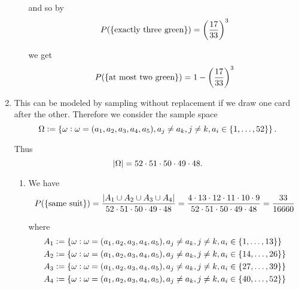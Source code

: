 \begin{enumerate}[label = \textbf{Exercise \arabic*.},wide = 0pt, itemsep=1.5ex]
\begin{enumerate}[label = \arabic*.,wide = 0pt, itemsep=1.5ex]
			\noindent and so by 
			\begin{equation*}
				P(\cbr[0]{\text{exactly three green}}) = \del[3]{\frac{17}{33}}^3
			\end{equation*}

			\noindent we get 
			\begin{equation*}
				P(\cbr[0]{\text{at most two green}}) = 1 - \del[3]{\frac{17}{33}}^3
			\end{equation*}
	\end{enumerate}
\item
	This can be modeled by sampling without replacement if we draw one card after the other. Therefore we consider the sample space
		\begin{equation*}
				\Omega := \cbr[0]{\omega : \omega = (a_1,a_2,a_3,a_4,a_5), a_j \neq a_k, j\neq k, a_i \in \cbr[0]{1,\dots,52}}.
		\end{equation*}

		Thus
		\begin{equation}
			\abs[0]{\Omega} = 52 \cdot 51 \cdot 50 \cdot 49 \cdot 48.
		\end{equation}
	\begin{enumerate}[label = \arabic*.,wide = 0pt, itemsep=1.5ex]
		\item 
			We have
			\begin{equation*}
				P(\cbr[0]{\text{same suit}}) = \frac{\abs[0]{A_1 \cup A_2 \cup A_3 \cup A_4}}{52 \cdot 51 \cdot 50 \cdot 49 \cdot 48} = \frac{4 \cdot 13 \cdot 12 \cdot 11 \cdot 10 \cdot 9}{52 \cdot 51 \cdot 50 \cdot 49 \cdot 48} = \frac{33}{16660}
			\end{equation*}

			\noindent where 
			\begin{align*}
				A_1 &:= \cbr[0]{\omega : \omega = (a_1,a_2,a_3,a_4,a_5), a_j \neq a_k, j\neq k, a_i \in \cbr[0]{1,\dots,13}}\\
				A_2 &:= \cbr[0]{\omega : \omega = (a_1,a_2,a_3,a_4,a_5), a_j \neq a_k, j\neq k, a_i \in \cbr[0]{14,\dots,26}}\\
				A_3 &:= \cbr[0]{\omega : \omega = (a_1,a_2,a_3,a_4,a_5), a_j \neq a_k, j\neq k, a_i \in \cbr[0]{27,\dots,39}}\\
				A_4 &:= \cbr[0]{\omega : \omega = (a_1,a_2,a_3,a_4,a_5), a_j \neq a_k, j\neq k, a_i \in \cbr[0]{40,\dots,52}}
			\end{align*}
	

\end{enumerate}
\end{enumerate}
